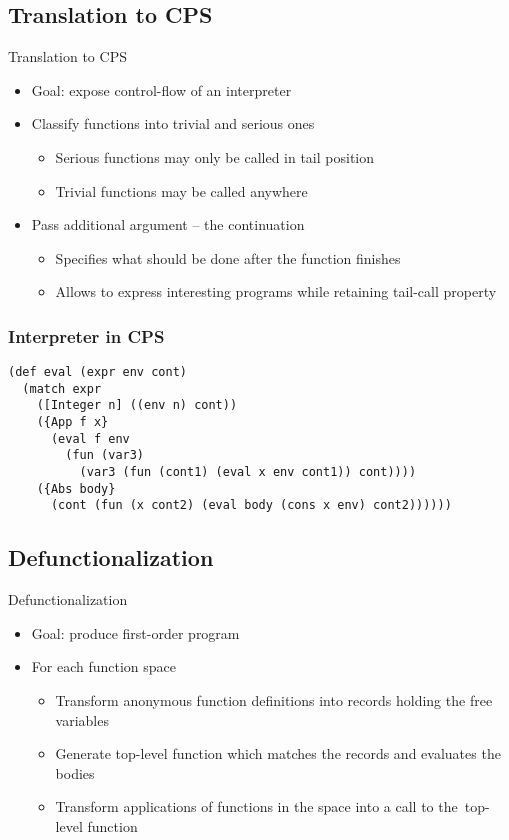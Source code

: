 \documentclass{beamer}
\begin{document}
\subsection{Translation to CPS}

\begin{frame}{Translation to CPS}
  \begin{itemize}
    \item Goal: expose control-flow of an interpreter
    \item Classify functions into trivial and serious ones
    \begin{itemize}
      \item Serious functions may only be called in tail position
      \item Trivial functions may be called anywhere
    \end{itemize}
    \pause
    \item Pass additional argument -- the continuation
    \begin{itemize}
      \item Specifies what should be done after the function finishes
      \item Allows to express interesting programs while retaining tail-call property
    \end{itemize}
  \end{itemize}
\end{frame}

\begin{frame}[fragile]
  \frametitle{Interpreter in CPS}
  \begin{lstlisting}
(def eval (expr env cont)
  (match expr
    ([Integer n] ((env n) cont))
    ({App f x}
      (eval f env
        (fun (var3)
          (var3 (fun (cont1) (eval x env cont1)) cont))))
    ({Abs body}
      (cont (fun (x cont2) (eval body (cons x env) cont2))))))
  \end{lstlisting}
\end{frame}

\subsection{Defunctionalization}

\begin{frame}{Defunctionalization}
  \begin{itemize}
    \item Goal: produce first-order program
    \item For each function space
    \begin{itemize}
      \item Transform anonymous function definitions into records holding the free variables
      \item Generate top-level function which matches the records and evaluates the bodies
      \item Transform applications of functions in the space into a call to the~top-level function
    \end{itemize}
  \end{itemize}
\end{frame}
\end{document}
